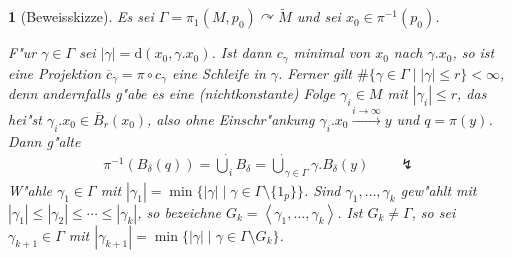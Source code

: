 \documentclass[paper=A4, twoside, chapterprefix=true, bibliography=totoc, headsepline]{scrbook}
\newcommand{\tikzgitter}[3][0.25]{ %
	\draw[step=#1,gray!15] #2 grid #3;
	\draw[step=2*#1,gray!30] #2 grid #3;
	\fill (0,0) circle(0.1); 
}
\newcommand{\tikztorus}[2][1]{
	\draw[] #2  ellipse (#1*2 and #1*1);
	
	\begin{scope}
		\clip ($#2 - #1*(1, 0.5)$) rectangle ($#2 + #1*(1, 1)$);
		\path[draw,name path=gkreis] ($#2 + #1*(0,0.75)$) ellipse (#1*1.25 and #1*1);
	\end{scope}
	\path[name path=kkreis] ($#2 - #1*(0,0.5)$) ellipse (#1*1 and #1*0.75);
	\path[name intersections={of=gkreis and kkreis}];
	\begin{scope}
		\clip (intersection-1) rectangle ($(intersection-2)+(0,0.5)$);
		\draw ($#2 - #1*(0,0.5)$) ellipse (#1*1 and #1*0.75);
	\end{scope}
	
	\def\torusbreite{#1*2}
	\def\torushoehe{#1*1}
	\def\torusdicke{#1*0.75}
	\coordinate (torusUntenLoch) at ($#2 - #1*(0,0.25)$);
	\coordinate (torusUnten) at ($#2 - #1*(0,1)$);
}
\newcommand{\dop}{\mathrm{d}}
\theoremstyle{plain}
\theoremstyle{nonumberplain}
\theoremstyle{empty}
\newtheorem{emptythm}{}%
\theoremstyle{break}
\begin{document}
\begin{emptythm}[Beweisskizze]
Es sei $\Gamma = \pi_1(M,p_0) \curvearrowright \tilde M$ und sei $x_0 \in \pi^{-1}(p_0)$.
\begin{center}\end{center}
F"ur $\gamma \in \Gamma$ sei $|\gamma| = \dop(x_0, \gamma . x_0)$.
Ist dann $c_{\gamma}$ minimal von $x_0$ nach $\gamma . x_0$, so ist eine Projektion $\overline c_{\gamma} = \pi \circ c_{\gamma}$ eine Schleife in $\gamma$.
Ferner gilt $\#\{\gamma \in \Gamma \mid | \gamma | \leq r \} < \infty$, denn andernfalls g"abe es eine (nichtkonstante) Folge $\gamma_i \in M$ mit $|\gamma_i| \leq r$, das hei"st $\gamma_i . x_0 \in \overline B_r(x_0)$, also ohne Einschr"ankung $\gamma_i . x_0 \xrightarrow{i \to \infty} y$ und $q = \pi(y)$. Dann g"alte
\begin{align*}
	\pi^{-1}(B_{\delta}(q)) = \dot \bigcup_{i} B_{\delta} = \dot \bigcup_{\gamma \in \Gamma} \gamma . B_{\delta}(y) \qquad \lightning
\end{align*}
W"ahle $\gamma_1 \in \Gamma$ mit $|\gamma_1| = \min \{ |\gamma| \mid \gamma \in \Gamma \setminus \{1_p\} \}$.
Sind $\gamma_1, \ldots, \gamma_k$ gew"ahlt mit $|\gamma_1| \leq |\gamma_2| \leq \cdots \leq |\gamma_k|$, so bezeichne $G_k = \left< \gamma_1, \ldots, \gamma_k\right>$.
Ist $G_k \neq \Gamma$, so sei $\gamma_{k+1} \in \Gamma$ mit $|\gamma_{k+1}| = \min \{ |\gamma| \mid \gamma \in \Gamma \setminus G_k\}$.


\end{emptythm}
\end{document}
